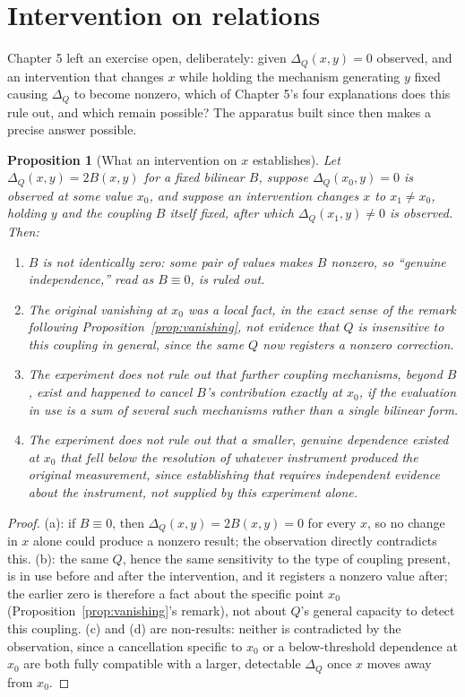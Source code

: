 \documentclass[11pt]{book}
\newtheorem{proposition}[theorem]{Proposition}
\begin{document}
\section{Intervention on relations}

Chapter 5 left an exercise open, deliberately: given $\Delta_Q(x,y)=0$ observed, and an intervention that changes $x$ while holding the mechanism generating $y$ fixed causing $\Delta_Q$ to become nonzero, which of Chapter 5's four explanations does this rule out, and which remain possible? The apparatus built since then makes a precise answer possible.

\begin{proposition}[What an intervention on $x$ establishes]
\label{prop:intervention}
Let $\Delta_Q(x,y)=2B(x,y)$ for a fixed bilinear $B$, suppose $\Delta_Q(x_0,y)=0$ is observed at some value $x_0$, and suppose an intervention changes $x$ to $x_1\ne x_0$, holding $y$ and the coupling $B$ itself fixed, after which $\Delta_Q(x_1,y)\ne0$ is observed. Then:
\begin{enumerate}
\item[(a)] $B$ is not identically zero: some pair of values makes $B$ nonzero, so ``genuine independence,'' read as $B\equiv0$, is ruled out.
\item[(b)] The original vanishing at $x_0$ was a local fact, in the exact sense of the remark following Proposition~\ref{prop:vanishing}, not evidence that $Q$ is insensitive to this coupling in general, since the same $Q$ now registers a nonzero correction.
\item[(c)] The experiment does not rule out that further coupling mechanisms, beyond $B$, exist and happened to cancel $B$'s contribution exactly at $x_0$, if the evaluation in use is a sum of several such mechanisms rather than a single bilinear form.
\item[(d)] The experiment does not rule out that a smaller, genuine dependence existed at $x_0$ that fell below the resolution of whatever instrument produced the original measurement, since establishing that requires independent evidence about the instrument, not supplied by this experiment alone.
\end{enumerate}
\end{proposition}
\begin{proof}
(a): if $B\equiv0$, then $\Delta_Q(x,y)=2B(x,y)=0$ for every $x$, so no change in $x$ alone could produce a nonzero result; the observation directly contradicts this. (b): the same $Q$, hence the same sensitivity to the type of coupling present, is in use before and after the intervention, and it registers a nonzero value after; the earlier zero is therefore a fact about the specific point $x_0$ (Proposition~\ref{prop:vanishing}'s remark), not about $Q$'s general capacity to detect this coupling. (c) and (d) are non-results: neither is contradicted by the observation, since a cancellation specific to $x_0$ or a below-threshold dependence at $x_0$ are both fully compatible with a larger, detectable $\Delta_Q$ once $x$ moves away from $x_0$.
\end{proof}
\end{document}
